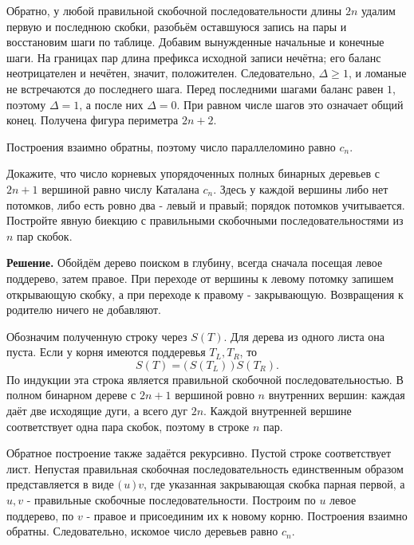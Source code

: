 \begin{problems}
\par Обратно, у любой правильной скобочной последовательности длины $2n$ удалим первую и последнюю скобки, разобьём оставшуюся запись на пары и восстановим шаги по таблице. Добавим вынужденные начальные и конечные шаги. На границах пар длина префикса исходной записи нечётна; его баланс неотрицателен и нечётен, значит, положителен. Следовательно, $\Delta\ge1$, и ломаные не встречаются до последнего шага. Перед последними шагами баланс равен $1$, поэтому $\Delta=1$, а после них $\Delta=0$. При равном числе шагов это означает общий конец. Получена фигура периметра $2n+2$.
\par Построения взаимно обратны, поэтому число параллеломино равно $c_n$.\par

\item Докажите, что число корневых упорядоченных полных бинарных деревьев с $2n+1$ вершиной равно числу Каталана $c_n$. Здесь у каждой вершины либо нет потомков, либо есть ровно два - левый и правый; порядок потомков учитывается. Постройте явную биекцию с правильными скобочными последовательностями из $n$ пар скобок.
\par\smallskip\noindent\textbf{Решение.} Обойдём дерево поиском в глубину, всегда сначала посещая левое поддерево, затем правое. При переходе от вершины к левому потомку запишем открывающую скобку, а при переходе к правому - закрывающую. Возвращения к родителю ничего не добавляют.
\par Обозначим полученную строку через $S(T)$. Для дерева из одного листа она пуста. Если у корня имеются поддеревья $T_L,T_R$, то
\[
S(T)=\texttt{(}\,S(T_L)\,\texttt{)}\,S(T_R).
\]
По индукции эта строка является правильной скобочной последовательностью. В полном бинарном дереве с $2n+1$ вершиной ровно $n$ внутренних вершин: каждая даёт две исходящие дуги, а всего дуг $2n$. Каждой внутренней вершине соответствует одна пара скобок, поэтому в строке $n$ пар.
\par Обратное построение также задаётся рекурсивно. Пустой строке соответствует лист. Непустая правильная скобочная последовательность единственным образом представляется в виде $\texttt{(}\,u\,\texttt{)}\,v$, где указанная закрывающая скобка парная первой, а $u,v$ - правильные скобочные последовательности. Построим по $u$ левое поддерево, по $v$ - правое и присоединим их к новому корню. Построения взаимно обратны. Следовательно, искомое число деревьев равно $c_n$.\par


\end{problems}
